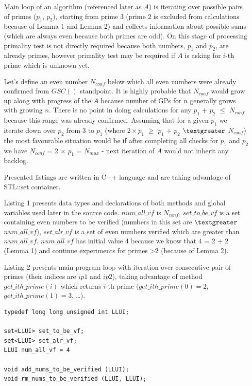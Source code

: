 \documentclass[10pt,twocolumn]{article}
\begin{document}
Main loop of an algorithm (referenced later as $A$) is iterating over possible pairs of primes ($p_1$, $p_2$), starting from prime $3$ (prime $2$ is excluded from calculations because of Lemma 1 and Lemma 2) and collects information about possible sums (which are always even because both primes are odd). On this stage of processing primality test is not directly required because both numbers, $p_1$ and $p_2$, are already primes, however primality test may be required if $A$ is asking for $i$-th prime which is unknown yet. \par
Let's define an even number $N_{conf}$ below which all even numbers were already confirmed from $GSC()$ standpoint. It is highly probable that $N_{conf}$ would grow up along with progress of the $A$ because number of GPs for $n$ generally grows with growing $n$. There is no point in doing calculations for any $p_1$ + $p_2$ $\leq$ $N_{conf}$ because this range was already confirmed. Assuming that for a given $p_1$ we iterate down over $p_2$ from $3$ to $p_1$ (where $2 \times p_1$ $\geq$ $p_1$ + $p_2$ $\textgreater$ $N_{conf}$) the most favourable situation would be if after completing all checks for $p_1$ and $p_2$ we have $N_{conf}$ = 2 $\times$ $p_1$ = $N_{max}$ - next iteration of $A$ would not inherit any backlog. \par
Presented listings are written in C++ language and are taking advantage of STL::set container.\par
Listing 1 presents data types and declarations of both methods and global variables used later in the source code. $num\_all\_vf$ is $N_{conf}$, $set\_to\_be\_vf$ is a set containing even numbers to be verified (numbers in this set are $\textgreater$ $num\_all\_vf$), $set\_alr\_vf$ is a set of even numbers verified which are greater than $num\_all\_vf$. $num\_all\_vf$ has initial value 4 because we know that 4 = 2 + 2 (Lemma 1) and continue experiments for primes \textgreater 2 (because of Lemma 2). \par
Listing 2 presents main program loop with iteration over consecutive pair of primes (their indices are $ip1$ and $ip2$), taking advantage of method $get\_ith\_prime(i)$ which returns $i$-th prime ($get\_ith\_prime(0)=2$, $get\_ith\_prime(1)=3$, \ldots).

\lstset{language=C++}
\lstset{breaklines=true}
\lstset{frame=shadowbox}
\lstset{caption=Declarations and main settings}
\begin{lstlisting}[linewidth=8.7cm]
typedef long long unsigned int LLUI;

set<LLUI> set_to_be_vf;
set<LLUI> set_alr_vf;
LLUI num_all_vf = 4

void add_nums_to_be_verified (LLUI);
void rm_nums_to_be_verified (LLUI, LLUI);
\end{lstlisting}
\end{document}

